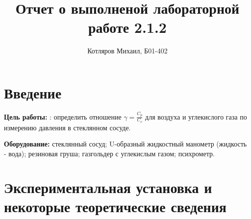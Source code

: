 \documentclass[a4paper]{article}
\title{\textbf{Отчет о выполненой лабораторной работе 2.1.2}}
\date{}
\author{Котляров Михаил, Б01-402}
\begin{document}
\maketitle
	
	\section{Введение}
	
	\textbf{Цель работы:} : определить отношение $\gamma = \frac{C_p}{C_v}$ для воздуха и углекислого газа по измерению давления в стеклянном сосуде.

	\textbf{Оборудование:} стеклянный сосуд; U-образный жидкостный манометр (жидкость - вода); резиновая груша; газгольдер с углекислым газом; психрометр.
	
	\section{Экспериментальная установка и некоторые теоретические сведения}
\end{document}
